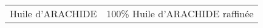 \begin{tabular}{p{7cm}p{7cm}}
                                                                                                                                                                                                                                                                                                                                                                                                                                                                                                                                                                                                                                                                                                                                                                                                                                                                                                                                                                                                                                                                                                                                                                                                                                                                                                                                                                                                                                                                                                                                                                                                                                                                                                    Huile d'ARACHIDE &                                                                                                                                                                                                                                                                                                                                                                                                                                                                                                                               100\% Huile d'ARACHIDE raffinée \\

\end{tabular}
